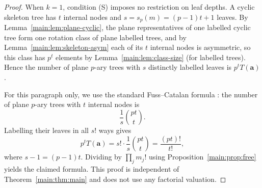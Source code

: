 \documentclass[11pt]{article}
\theoremstyle{definition}
\theoremstyle{remark}
\numberwithin{equation}{section}
\numberwithin{figure}{section}
\begin{document}
\begin{proof}
When $k=1$, condition (S) imposes no restriction on leaf depths.  A cyclic skeleton tree has $t$ internal nodes and $s=s_p(m)=(p-1)t+1$ leaves.  By Lemma~\ref{main:lem:plane-cyclic}, the plane representatives of one labelled cyclic tree form one rotation class of plane labelled trees, and by Lemma~\ref{main:lem:skeleton-asym} each of its $t$ internal nodes is asymmetric, so this class has $p^t$ elements by Lemma~\ref{main:lem:class-size} (for labelled trees).  Hence the number of plane $p$-ary trees with $s$ distinctly labelled leaves is $p^tT(\mathbf a)$.

For this paragraph only, we use the standard Fuss--Catalan formula \cite{Konvalinka}: the number of plane $p$-ary trees with $t$ internal nodes is
\[
 \frac1s\binom{pt}{t}.
\]
Labelling their leaves in all $s!$ ways gives
\[
 p^tT(\mathbf a)=s!\cdot\frac1s\binom{pt}{t}
 =\frac{(pt)!}{t!},
\]
where $s-1=(p-1)t$.  Dividing by $\prod_jm_j!$ using Proposition~\ref{main:prop:free} yields the claimed formula.  This proof is independent of Theorem~\ref{main:thm:main} and does not use any factorial valuation.
\end{proof}
\end{document}
